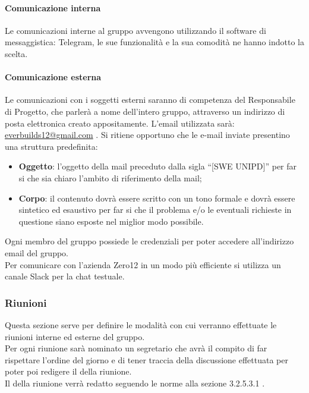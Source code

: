             \paragraph{Comunicazione interna}
                Le comunicazioni interne al gruppo avvengono utilizzando il software di messaggistica: Telegram, le sue funzionalità e la sua comodità ne hanno indotto la scelta.
            \paragraph{Comunicazione esterna}
                Le comunicazioni con i soggetti esterni saranno di competenza del Responsabile di Progetto, che parlerà a nome dell’intero gruppo, attraverso un indirizzo di posta elettronica creato appositamente. L’email utilizzata sarà: \url{everbuilds12@gmail.com} .
                Si ritiene opportuno che le e-mail inviate presentino una struttura predefinita:
                \begin{itemize}
                    \item\textbf{Oggetto}: l’oggetto della mail preceduto dalla sigla “[SWE UNIPD]” per far si che sia chiaro l’ambito di riferimento della mail;
                    \item\textbf{Corpo}: il contenuto dovrà essere scritto con un tono formale e dovrà essere sintetico ed esaustivo per far si che il problema e/o le eventuali richieste in questione siano esposte nel miglior modo possibile.
                \end{itemize}
                Ogni membro del gruppo possiede le credenziali per poter accedere all’indirizzo email del gruppo.\\
                Per comunicare con l’azienda Zero12 in un modo più efficiente si utilizza un canale Slack per la chat testuale.
        \subsubsection{Riunioni}
            Questa sezione serve per definire le modalità con cui verranno effettuate le riunioni interne ed esterne del gruppo. \\
            Per ogni riunione sarà nominato un segretario che avrà il compito di far rispettare l’ordine del giorno e di tener traccia della discussione effettuata per poter poi redigere il  della riunione.\\
            Il  della riunione verrà redatto seguendo le norme alla sezione 3.2.5.3.1 .\\
